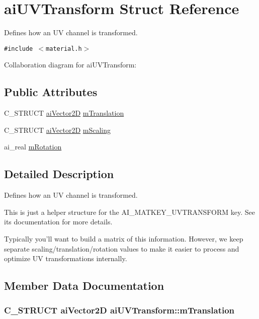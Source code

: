 \hypertarget{structai_u_v_transform}{
\section{aiUVTransform Struct Reference}
\label{structai_u_v_transform}
}
Defines how an UV channel is transformed.  


{\tt \#include $<$material.h$>$}

Collaboration diagram for aiUVTransform:\subsection*{Public Attributes}
\begin{CompactItemize}
\item 
C\_\-STRUCT \hyperlink{structai_vector2_d}{aiVector2D} \hyperlink{structai_u_v_transform_8c7f35959aa342bf0cef670246fbb813}{mTranslation}
\item 
C\_\-STRUCT \hyperlink{structai_vector2_d}{aiVector2D} \hyperlink{structai_u_v_transform_89429a027cbf914e7212e48149a957c8}{mScaling}
\item 
ai\_\-real \hyperlink{structai_u_v_transform_157005aadfdd145a56c7831c7b24f1ea}{mRotation}
\end{CompactItemize}


\subsection{Detailed Description}
Defines how an UV channel is transformed. 

This is just a helper structure for the AI\_\-MATKEY\_\-UVTRANSFORM key. See its documentation for more details.

Typically you'll want to build a matrix of this information. However, we keep separate scaling/translation/rotation values to make it easier to process and optimize UV transformations internally. 

\subsection{Member Data Documentation}
\hypertarget{structai_u_v_transform_8c7f35959aa342bf0cef670246fbb813}{
\subsubsection[mTranslation]{\setlength{\rightskip}{0pt plus 5cm}C\_\-STRUCT {\bf aiVector2D} {\bf aiUVTransform::mTranslation}}}
\label{structai_u_v_transform_8c7f35959aa342bf0cef670246fbb813}


